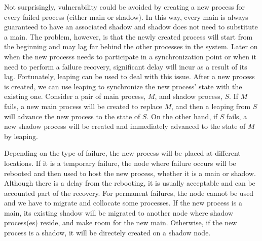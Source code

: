 Not surprisingly, vulnerability could be avoided by creating a new process for every failed process (either main or shadow). In this way, every main is always guaranteed to have an associated shadow and shadow does not need to substitute a main. The problem, however, is that the newly created process will start from the beginning and may lag far behind the other processes in the system. Later on when the new processs needs to participate in a synchronization point or when it need to perform a failure recovery, significant delay will incur as a result of its lag. Fortunately, leaping can be used to deal with this issue. After a new process is created, we can use leaping to synchronize the new process' state with the existing one. Consider a pair of main process, $M$, and shadow process, $S$. If $M$ fails, a new main process will be created to replace $M$, and then a leaping from $S$ will advance the new process to the state of $S$. On the other hand, if $S$ fails, a new shadow process will be created and immediately advanced to the state of $M$ by leaping. 

Depending on the type of failure, the new process will be placed at different locations. If it is a temporary failure, the node where failure occurs will be rebooted and then used to host the new process, whether it is a main or shadow. Although there is a delay from the rebooting, it is usually acceptable and can be accounted part of the recovery. 
For permanent failures, the node cannot be used and we have to migrate and collocate some processes. If the new process is a main, its existing shadow will be migrated to another node where shadow process(es) reside, and make room for the new main. Otherwise, if the new process is a shadow, it will be directely created on a shadow node. 